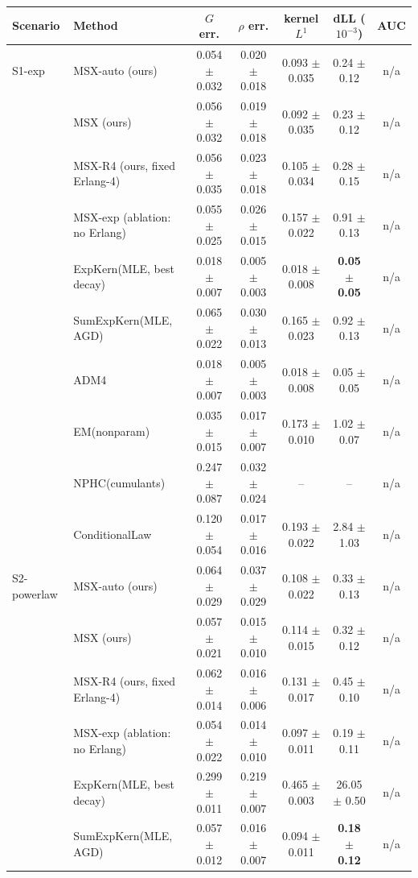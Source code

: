 \begin{tabular}{llccccc}
\toprule
Scenario & Method & $G$ err. & $\rho$ err. & kernel $L^1$ & dLL ($10^{-3}$) & AUC \\
\midrule
S1-exp & MSX-auto (ours) & 0.054 $\pm$ 0.032 & 0.020 $\pm$ 0.018 & 0.093 $\pm$ 0.035 & 0.24 $\pm$ 0.12 & n/a \\
 & MSX (ours) & 0.056 $\pm$ 0.032 & 0.019 $\pm$ 0.018 & 0.092 $\pm$ 0.035 & 0.23 $\pm$ 0.12 & n/a \\
 & MSX-R4 (ours, fixed Erlang-4) & 0.056 $\pm$ 0.035 & 0.023 $\pm$ 0.018 & 0.105 $\pm$ 0.034 & 0.28 $\pm$ 0.15 & n/a \\
 & MSX-exp (ablation: no Erlang) & 0.055 $\pm$ 0.025 & 0.026 $\pm$ 0.015 & 0.157 $\pm$ 0.022 & 0.91 $\pm$ 0.13 & n/a \\
 & ExpKern(MLE, best decay) & 0.018 $\pm$ 0.007 & 0.005 $\pm$ 0.003 & 0.018 $\pm$ 0.008 & \textbf{0.05 $\pm$ 0.05} & n/a \\
 & SumExpKern(MLE, AGD) & 0.065 $\pm$ 0.022 & 0.030 $\pm$ 0.013 & 0.165 $\pm$ 0.023 & 0.92 $\pm$ 0.13 & n/a \\
 & ADM4 & 0.018 $\pm$ 0.007 & 0.005 $\pm$ 0.003 & 0.018 $\pm$ 0.008 & 0.05 $\pm$ 0.05 & n/a \\
 & EM(nonparam) & 0.035 $\pm$ 0.015 & 0.017 $\pm$ 0.007 & 0.173 $\pm$ 0.010 & 1.02 $\pm$ 0.07 & n/a \\
 & NPHC(cumulants) & 0.247 $\pm$ 0.087 & 0.032 $\pm$ 0.024 & -- & -- & n/a \\
 & ConditionalLaw & 0.120 $\pm$ 0.054 & 0.017 $\pm$ 0.016 & 0.193 $\pm$ 0.022 & 2.84 $\pm$ 1.03 & n/a \\
\midrule
S2-powerlaw & MSX-auto (ours) & 0.064 $\pm$ 0.029 & 0.037 $\pm$ 0.029 & 0.108 $\pm$ 0.022 & 0.33 $\pm$ 0.13 & n/a \\
 & MSX (ours) & 0.057 $\pm$ 0.021 & 0.015 $\pm$ 0.010 & 0.114 $\pm$ 0.015 & 0.32 $\pm$ 0.12 & n/a \\
 & MSX-R4 (ours, fixed Erlang-4) & 0.062 $\pm$ 0.014 & 0.016 $\pm$ 0.006 & 0.131 $\pm$ 0.017 & 0.45 $\pm$ 0.10 & n/a \\
 & MSX-exp (ablation: no Erlang) & 0.054 $\pm$ 0.022 & 0.014 $\pm$ 0.010 & 0.097 $\pm$ 0.011 & 0.19 $\pm$ 0.11 & n/a \\
 & ExpKern(MLE, best decay) & 0.299 $\pm$ 0.011 & 0.219 $\pm$ 0.007 & 0.465 $\pm$ 0.003 & 26.05 $\pm$ 0.50 & n/a \\
 & SumExpKern(MLE, AGD) & 0.057 $\pm$ 0.012 & 0.016 $\pm$ 0.007 & 0.094 $\pm$ 0.011 & \textbf{0.18 $\pm$ 0.12} & n/a \\

\end{tabular}
